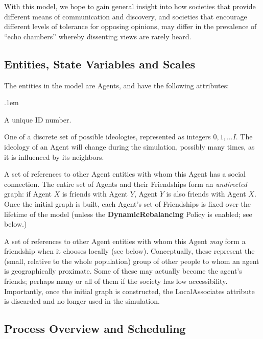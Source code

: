 With this model, we hope to gain general insight into how societies that
provide different means of communication and discovery, and societies that
encourage different levels of tolerance for opposing opinions, may differ in
the prevalence of ``echo chambers'' whereby dissenting views are rarely heard.

\subsection{Entities, State Variables and Scales}

The entities in the model are Agents, and have the following attributes:

\begin{description}
\itemsep.1em
\item[ID] A unique ID number.

\item[Ideology] One of a discrete set of possible ideologies, represented as
integers $0, 1, \dots I$. The ideology of an Agent will change during the
simulation, possibly many times, as it is influenced by its neighbors.

\item[Friendships] A set of references to other Agent entities with whom this
Agent has a social connection. The entire set of Agents and their Friendships
form an \textit{undirected} graph: if Agent $X$ is friends with Agent $Y$,
Agent $Y$ is also friends with Agent $X$.  Once the initial graph is built,
each Agent's set of Friendships is fixed over the lifetime of the model
(unless the \textbf{DynamicRebalancing} Policy is enabled; see below.)

\item[LocalAssociates] A set of references to other Agent entities with whom
this Agent \textit{may} form a friendship when it chooses locally (see below).
Conceptually, these represent the (small, relative to the whole population)
group of other people to whom an agent is geographically proximate. Some of
these may actually become the agent's friends; perhaps many or all of them if
the society has low accessibility. Importantly, once the initial graph is
constructed, the LocalAssociates attribute is discarded and no longer used in
the simulation.

\end{description}



\subsection{Process Overview and Scheduling}
\label{sec:BVM}

